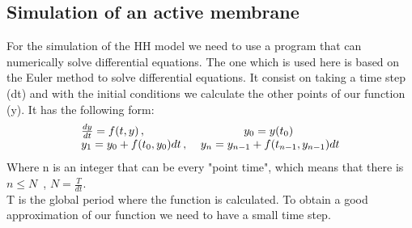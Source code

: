 \documentclass[a4paper,11pt]{report}
\begin{document}
\subsection{Simulation of an active membrane}
For the simulation of the HH model we need to use a program that can numerically solve differential equations. The one which is used here is based on the Euler method to solve differential equations. It consist on taking a time step (dt) and with the initial conditions we calculate the other points of our function (y). It has the following form: \\
$$
\begin{array}{l c} 
\frac{dy}{dt}=f(t,y)\, , & y_{0}=y(t_{0})\\
y_{1}=y_{0}+f(t_{0},y_{0})dt \, , & \; y_{n}=y_{n-1}+f(t_{n-1},y_{n-1})dt \\
\end{array}
$$
Where n is an integer that can be every "point time", which means that there is $n \leq N$\ , $N=\frac{T}{dt}$. \\
 T is the global period where the function is calculated. To obtain a good approximation of our function we need to have a small time step.  \\
\end{document}
